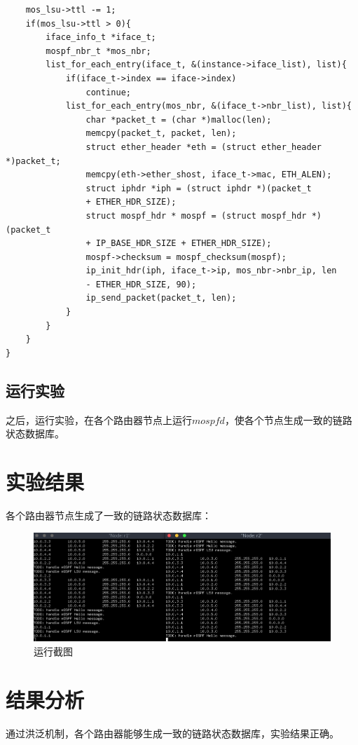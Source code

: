 \documentclass[UTF8,noindent]{ctexart}
\begin{document}
\begin{lstlisting}
    mos_lsu->ttl -= 1;
    if(mos_lsu->ttl > 0){
    	iface_info_t *iface_t;
    	mospf_nbr_t *mos_nbr;
    	list_for_each_entry(iface_t, &(instance->iface_list), list){
    		if(iface_t->index == iface->index)
    			continue;
            list_for_each_entry(mos_nbr, &(iface_t->nbr_list), list){
            	char *packet_t = (char *)malloc(len);
            	memcpy(packet_t, packet, len);
            	struct ether_header *eth = (struct ether_header *)packet_t;    
                memcpy(eth->ether_shost, iface_t->mac, ETH_ALEN);
                struct iphdr *iph = (struct iphdr *)(packet_t 
				+ ETHER_HDR_SIZE);
                struct mospf_hdr * mospf = (struct mospf_hdr *)(packet_t 
				+ IP_BASE_HDR_SIZE + ETHER_HDR_SIZE);
                mospf->checksum = mospf_checksum(mospf);
                ip_init_hdr(iph, iface_t->ip, mos_nbr->nbr_ip, len 
				- ETHER_HDR_SIZE, 90);
                ip_send_packet(packet_t, len);
            }
    	}
    }
}
\end{lstlisting}

\subsection{运行实验}
之后，运行实验，在各个路由器节点上运行$mospfd$，使各个节点生成一致的链路状态数据库。
\section*{{实验结果}}
各个路由器节点生成了一致的链路状态数据库：
\begin{figure}[H]
  \centering
  \includegraphics[scale = 0.3]{1.png}
  \caption{运行截图}
\end{figure}

\section*{{结果分析}}
通过洪泛机制，各个路由器能够生成一致的链路状态数据库，实验结果正确。
\end{document}
